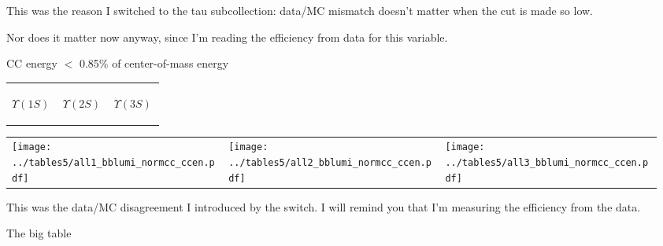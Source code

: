 \documentclass[landscape]{article}
\begin{document}
\vfill

This was the reason I switched to the tau subcollection: data/MC
mismatch doesn't matter when the cut is made so low.

\vfill

Nor does it matter now anyway, since I'm reading the efficiency from
data for this variable.

\vfill

\pagebreak

CC energy $<$ 0.85\% of center-of-mass energy

\vspace{-1.75 cm}
\begin{center}
  \begin{tabular}{p{0.32\linewidth} p{0.32\linewidth} p{0.32\linewidth}}
    \begin{center} $\Upsilon(1S)$ \end{center} & \begin{center} $\Upsilon(2S)$ \end{center} & \begin{center} $\Upsilon(3S)$ \end{center} \\
  \end{tabular}

  \vspace{-0.75 cm}
  \begin{tabular}{p{0.32\linewidth} p{0.32\linewidth} p{0.32\linewidth}}
    \texttt{[image: ../tables5/all1\_bblumi\_normcc\_ccen.pdf]} &
    \texttt{[image: ../tables5/all2\_bblumi\_normcc\_ccen.pdf]} &
    \texttt{[image: ../tables5/all3\_bblumi\_normcc\_ccen.pdf]}
  \end{tabular}
\end{center}

\vfill

This was the data/MC disagreement I introduced by the switch.  I will
remind you that I'm measuring the efficiency from the data.

\vfill

\pagebreak

The big table

\vfill
\end{document}

